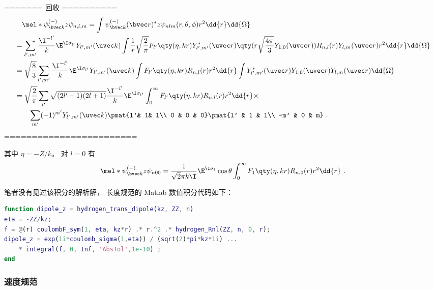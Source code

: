 ======= 回收 ==========
\begin{equation}
\begin{aligned}
&\quad\mel*{\psi_{\bvec k}^{(-)}}{z}{\psi_{n,l,m}} = \int \psi_{\bvec k}^{(-)}(\bvec r)^* z \psi_{nlm}(r,\theta,\phi) r^2 \dd{r}\dd{\Omega}\\
&= \sum_{l',m'} \frac{\I^{-l'}}{k} \E^{\I\sigma_{l'}} Y_{l',m'}(\uvec k) \int \frac{1}{r} \sqrt{\frac{2}{\pi}} F_{l'}\qty(\eta, kr) Y_{l',m'}^*(\uvec r) \qty(r \sqrt{\frac{4\pi}{3}} Y_{1,0}(\uvec r))R_{n,l}(r) Y_{l,m}(\uvec r) r^2 \dd{r}\dd{\Omega}\\
&= \sqrt{\frac{8}{3}}\sum_{l',m'} \frac{\I^{-l'}}{k} \E^{\I\sigma_{l'}} Y_{l',m'}(\uvec k) \int F_{l'}\qty(\eta, kr) R_{n,l}(r) r^2 \dd{r} \int Y_{l',m'}^*(\uvec r)Y_{1,0}(\uvec r)Y_{l,m}(\uvec r) \dd{\Omega}\\
&= \sqrt{\frac{2}{\pi}} \sum_{l'} \sqrt{(2l'+1)(2l+1)} \frac{\I^{-l'}}{k} \E^{\I\sigma_{l'}} \int_0^\infty F_{l'}\qty(\eta, kr) R_{n,l}(r) r^2 \dd{r}\times\\
& \qquad \sum_{m'}  (-1)^{m'} Y_{l',m'}(\uvec k) \pmat{l'& 1& l\\ 0 & 0 & 0}\pmat{l' & 1 & l\\  -m' & 0 & m}~.
\end{aligned}
\end{equation}
========================

其中 $\eta = -Z/k$。 对 $l=0$ 有
\begin{equation}
\mel*{\psi_{\bvec k}^{(-)}}{z}{\psi_{n00}} = \frac{1}{\sqrt{2}\pi k\I} \E^{\I\sigma_1} \cos\theta \int_0^\infty F_1\qty(\eta, kr) R_{n,0}(r)r^2 \dd{r}~.
\end{equation}


笔者没有见过该积分的解析解， 长度规范的 Matlab 数值积分代码如下：

\begin{lstlisting}[language=matlab, caption=hydrogen\_trans\_dipole.m]
function dipole_z = hydrogen_trans_dipole(kz, ZZ, n)
eta = -ZZ/kz;
f = @(r) coulombF_sym(1, eta, kz*r) .* r.^2 .* hydrogen_Rnl(ZZ, n, 0, r);
dipole_z = exp(1i*coulomb_sigma(1,eta)) / (sqrt(2)*pi*kz*1i) ...
    * integral(f, 0, Inf, 'AbsTol',1e-10) ;
end
\end{lstlisting}

\subsubsection{速度规范}

